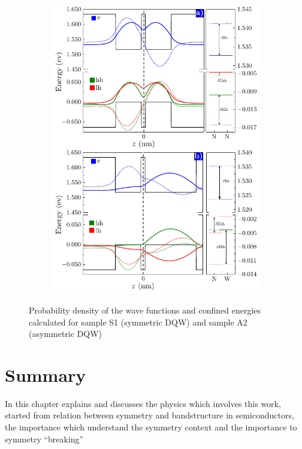 \begin{figure}[H]
	\centering
\begin{subfigure}{\textwidth}
	\includegraphics[width=\textwidth]{../figures/chapter-2/numerical-calculations/out/numerical-results-model.pdf}%
	\label{fig:chapter-2-sec-anisotropy-model-results-a}
	\label{fig:chapter-2-sec-anisotropy-model-results-b}
\end{subfigure}
	\caption{Probability density of the wave functions and confined energies calculated for  sample  S1 (symmetric DQW)  and  sample A2 (asymmetric DQW)}
	\label{fig:chapter-2-sec-anisotropy-model-results}
\end{figure}

\section{Summary}
\label{sec:chapter-2-summary}
\vspace{-10mm} 
In this chapter explains and discusses the physics which involves this work, started from relation between symmetry and bandstructure in semiconductors, the importance which understand the symmetry context and the importance to symmetry ``breaking''